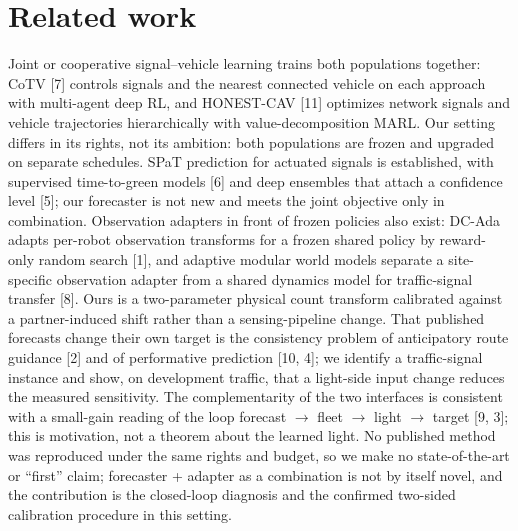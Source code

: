 \documentclass[11pt]{article}
\begin{document}
\section{Related work}
Joint or cooperative signal--vehicle learning trains both populations together: CoTV [7] controls signals and the nearest connected
vehicle on each approach with multi-agent deep RL, and HONEST-CAV [11] optimizes network signals and vehicle trajectories hierarchically
with value-decomposition MARL. Our setting differs in its rights, not its ambition: both populations are frozen and upgraded on
separate schedules. SPaT prediction for actuated signals is established, with supervised time-to-green models [6] and deep ensembles that
attach a confidence level [5]; our forecaster is not new and meets the joint objective only in combination. Observation adapters in front of frozen
policies also exist: DC-Ada adapts per-robot observation transforms for a frozen shared policy by reward-only random search [1], and
adaptive modular world models separate a site-specific observation adapter from a shared dynamics model for traffic-signal transfer [8].
Ours is a two-parameter physical count transform calibrated against a partner-induced shift rather than a sensing-pipeline change. That
published forecasts change their own target is the consistency problem of anticipatory route guidance [2] and of performative prediction
[10, 4]; we identify a traffic-signal instance and show, on development traffic, that a light-side input change reduces the measured
sensitivity. The complementarity of
the two interfaces is consistent with a small-gain reading of the loop forecast $\to$ fleet $\to$ light $\to$ target [9, 3]; this is
motivation, not a theorem about the learned light. No published method was reproduced under the same rights and budget, so we make no
state-of-the-art or ``first'' claim; forecaster + adapter as a combination is not by itself novel, and the contribution is the
closed-loop diagnosis and the confirmed two-sided calibration procedure in this setting.
\end{document}
